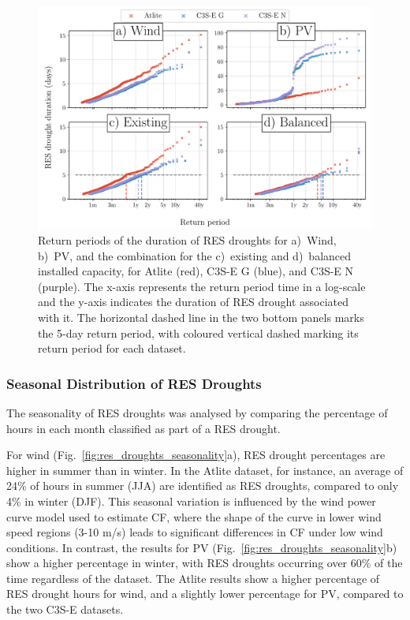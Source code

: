 \documentclass[a4paper, 11pt]{article}
\begin{document}
\begin{figure}[!ht]
	\centering
	\includegraphics[width=\textwidth]{droughts_return_periods}
	\caption{Return periods of the duration of RES droughts for a)~Wind, b)~PV, and the combination for the c)~existing and d)~balanced installed capacity, for Atlite (red), C3S-E G (blue), and C3S-E N (purple). The x-axis represents the return period time in a log-scale and the y-axis indicates the duration of RES drought associated with it. The horizontal dashed line in the two bottom panels marks the 5-day return period, with coloured vertical dashed marking its return period for each dataset.}
	\label{fig:return_periods}
\end{figure}

\newpage
\subsubsection{Seasonal Distribution of RES Droughts}

The seasonality of RES droughts was analysed by comparing the percentage of hours in each month classified as part of a RES drought. 

For wind (Fig.~\ref{fig:res_droughts_seasonality}a), RES drought percentages are higher in summer than in winter. In the Atlite dataset, for instance, an average of 24\% of hours in summer (JJA) are identified as RES droughts, compared to only 4\% in winter (DJF). This seasonal variation is influenced by the wind power curve model used to estimate CF, where the shape of the curve in lower wind speed regions (3-10 m/s) leads to significant differences in CF under low wind conditions. In contrast, the results for PV (Fig.~\ref{fig:res_droughts_seasonality}b) show a higher percentage in winter, with RES droughts occurring over 60\% of the time regardless of the dataset. The Atlite results show a higher percentage of RES drought hours for wind, and a slightly lower percentage for PV, compared to the two C3S-E datasets. 
\end{document}
